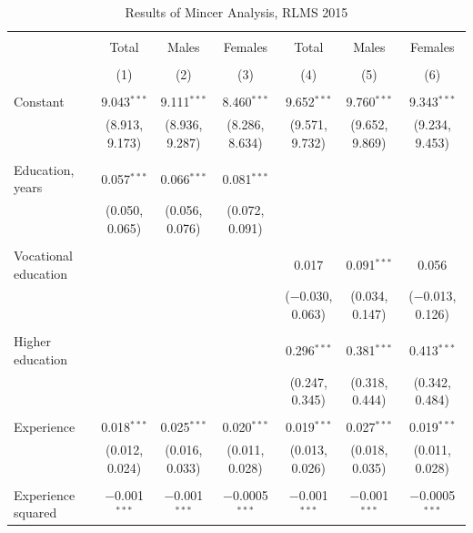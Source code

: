 \documentclass[alpha-refs]{wiley-article-01g}
\begin{document}
\begin{landscape}
	
	\fontsize{9}{11}
	\selectfont
	
	\begin{table}[!htbp] \centering 
\renewcommand{\arraystretch}{1.0}
		\caption{Results of Mincer Analysis, RLMS 2015} 
		\label{} 
		\begin{tabular}{@{\extracolsep{5pt}}lcccccc} 
			\\[-.8ex]\hline 
			\hline \\[-.8ex] 
			& Total & Males & Females & Total & Males & Females \\ 
			\\[-.8ex] & (1) & (2) & (3) & (4) & (5) & (6)\\ 
			\hline \\[-.8ex] 
			Constant & 9.043$^{***}$ & 9.111$^{***}$ & 8.460$^{***}$ & 9.652$^{***}$ & 9.760$^{***}$ & 9.343$^{***}$ \\ 
			& (8.913, 9.173) & (8.936, 9.287) & (8.286, 8.634) & (9.571, 9.732) & (9.652, 9.869) & (9.234, 9.453) \\ 
			& & & & & & \\ 
			Education, years & 0.057$^{***}$ & 0.066$^{***}$ & 0.081$^{***}$ &  &  &  \\ 
			& (0.050, 0.065) & (0.056, 0.076) & (0.072, 0.091) &  &  &  \\ 
			& & & & & & \\ 
			Vocational education &  &  &  & 0.017 & 0.091$^{***}$ & 0.056 \\ 
			&  &  &  & ($-$0.030, 0.063) & (0.034, 0.147) & ($-$0.013, 0.126) \\ 
			& & & & & & \\ 
			Higher education &  &  &  & 0.296$^{***}$ & 0.381$^{***}$ & 0.413$^{***}$ \\ 
			&  &  &  & (0.247, 0.345) & (0.318, 0.444) & (0.342, 0.484) \\ 
			& & & & & & \\ 
			Experience & 0.018$^{***}$ & 0.025$^{***}$ & 0.020$^{***}$ & 0.019$^{***}$ & 0.027$^{***}$ & 0.019$^{***}$ \\ 
			& (0.012, 0.024) & (0.016, 0.033) & (0.011, 0.028) & (0.013, 0.026) & (0.018, 0.035) & (0.011, 0.028) \\ 
			& & & & & & \\ 
			Experience squared & $-$0.001$^{***}$ & $-$0.001$^{***}$ & $-$0.0005$^{***}$ & $-$0.001$^{***}$ & $-$0.001$^{***}$ & $-$0.0005$^{***}$ \\ 

\end{tabular}
\end{table}
\end{landscape}
\end{document}
